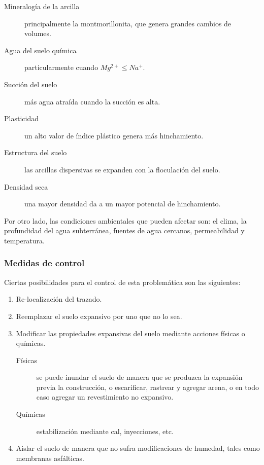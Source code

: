 \documentclass[../main.tex]{subfiles}
\begin{document}
\begin{description}
  \item[Mineralogía de la arcilla] principalmente la montmorillonita, que genera
    grandes cambios de volumes.
  \item[Agua del suelo química] particularmente cuando $Mg^{2+} \leq Na^{+}$.
  \item[Succión del suelo] más agua atraída cuando la succión es alta.
  \item[Plasticidad] un alto valor de índice plástico genera más hinchamiento.
  \item[Estructura del suelo] las arcillas dispersivas se expanden con la 
    floculación del suelo.
  \item[Densidad seca] una mayor densidad da a un mayor potencial de hinchamiento.
\end{description}


Por otro lado, las condiciones ambientales que pueden afectar son: el clima,
la profundidad del agua subterránea, fuentes de agua cercanos, permeabilidad
y temperatura.

\subsubsection{Medidas de control}

Ciertas posibilidades para el control de esta problemática son las siguientes:

\begin{enumerate}
  \item Re-localización del trazado.
  \item Reemplazar el suelo expansivo por uno que no lo sea.
  \item Modificar las propiedades expansivas del suelo mediante acciones 
    físicas o químicas.
    \begin{description}
      \item[Físicas] se puede inundar el suelo de manera que se produzca la
        expansión previa la construcción, o escarificar, rastrear y agregar arena,
        o en todo caso agregar un revestimiento no expansivo.
      \item[Químicas] estabilización mediante cal, inyecciones, etc.  
    \end{description}
  \item Aislar el suelo de manera que no sufra modificaciones de humedad, tales
    como membranas asfálticas.
\end{enumerate}
\end{document}
